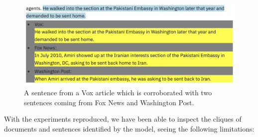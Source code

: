 \begin{figure}[!htbp]
    \centering
    \includegraphics[width=\linewidth]{figures/cluster_similar_sentences_amiri.png}
    \caption{A sentence from a Vox article which is corroborated with two sentences coming from Fox News and Washington Post.}
    \label{fig:cluster_similar_sentences_amiri}
\end{figure}

With the experiments reproduced, we have been able to inspect the cliques of documents and sentences identified by the model, seeing the following limitations:

